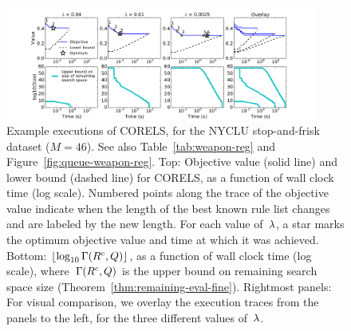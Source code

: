 \begin{figure}[t!]
\begin{center}
\includegraphics[trim={35mm 0mm 35mm 15mm},
width=0.92\textwidth]{figs/weapon_reg-execution.pdf}
\end{center}
\vspace{-5mm}
\caption{Example executions of CORELS, for the NYCLU stop-and-frisk dataset (${M = 46}$).
%
See also Table~\ref{tab:weapon-reg} and Figure~\ref{fig:queue-weapon-reg}.
%
Top: Objective value (solid line) and lower bound (dashed line) for CORELS,
as a function of wall clock time (log scale).
%
Numbered points along the trace of the objective value
indicate when the length of the best known rule list changes
and are labeled by the new length.
%
For each value of~${\lambda}$, a star marks the optimum objective value
and time at which it was achieved.
%
Bottom: $\lfloor \log_{10} \Gamma({R^c}, Q) \rfloor$,
as a function of wall clock time (log scale),
where~$\Gamma({R^c}, Q)$
is the upper bound on remaining search space size
(Theorem~\ref{thm:remaining-eval-fine}).
%
Rightmost panels: For visual comparison, we overlay the execution traces
from the panels to the left, for the three different values of~${\lambda}$.
}
\label{fig:weapon-reg-execution}
\end{figure}
%
